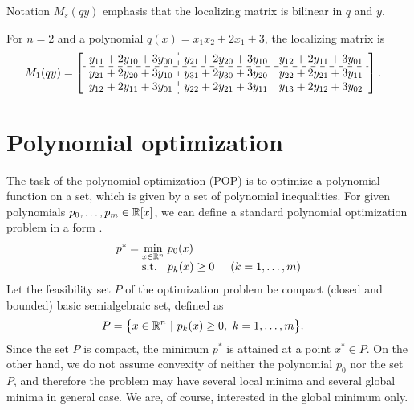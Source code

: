 Notation $M_s(qy)$ emphasis that the localizing matrix is bilinear in $q$ and $y$.

\begin{example}
  For $n = 2$ and a polynomial $q(x) = x_1x_2 + 2x_1 + 3$, the localizing matrix is
  \begin{align}
    M_1(qy) &= \left[\begin{array}{c:cc}
                    y_{11} +2y_{10} +3y_{00} & y_{21} +2y_{20} +3y_{10} & y_{12} +2y_{11} +3y_{01}\\\hdashline
                    y_{21} +2y_{20} +3y_{10} & y_{31} +2y_{30} +3y_{20} & y_{22} +2y_{21} +3y_{11}\\
                    y_{12} +2y_{11} +3y_{01} & y_{22} +2y_{21} +3y_{11} & y_{13} +2y_{12} +3y_{02}
               \end{array}\right].
  \end{align}
\end{example}

\section{Polynomial optimization}
The task of the polynomial optimization (POP) is to optimize a polynomial function on a set, which is given by a set of polynomial inequalities.
For given polynomials $p_0, \ldots, p_m \in \mathbb{R}[x]$, we can define a standard polynomial optimization problem in a form .
\begin{align}
  \arraycolsep=1.4pt
  \begin{array}{rclrcl@{\hskip0.5cm}l}
    p^* &=& \displaystyle \min_{x\in\R^n} & \multicolumn{3}{l}{p_0(x)} \\
    && \text{s.t.} & p_k(x) &\geq& 0 & (k = 1,\ldots,m)
  \end{array}\labeleq{POP:opt:polmin}
\end{align}
Let the feasibility set $P$ of the optimization problem  be compact (closed and bounded) basic semialgebraic set, defined as
\begin{align}
  P &= \big\{x\in\R^n\ |\ p_k(x)\geq0,\ k = 1,\ldots,m\big\}.\labeleq{POP:opt:polfea}
\end{align}
Since the set $P$ is compact, the minimum $p^*$ is attained at a point $x^*\in P$.
On the other hand, we do not assume convexity of neither the polynomial $p_0$ nor the set $P$, and therefore the problem  may have several local minima and several global minima in general case.
We are, of course, interested in the global minimum only.

